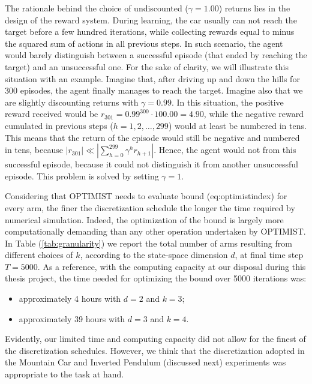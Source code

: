 \begin{remark} \label{rk:undiscounted}
The rationale behind the choice of undiscounted ($\gamma=1.00$) returns lies in the design of the reward system. During learning, the car usually can not reach the target before a few hundred iterations, while collecting rewards equal to minus the squared sum of actions in all previous steps. In such scenario, the agent would barely distinguish between a successful episode (that ended by reaching the target) and an unsuccessful one. For the sake of clarity, we will illustrate this situation with an example. Imagine that, after driving up and down the hills for 300 episodes, the agent finally manages to reach the target. Imagine also that we are slightly discounting returns with $\gamma=0.99$. In this situation, the positive reward received would be $r_{301}=0.99^{300}\cdot 100.00=4.90$, while the negative reward cumulated in previous steps ($h=1,2,\dots,299$) would at least be numbered in tens. This means that the return of the episode would still be negative and numbered in tens, because $|r_{301}|\ll |\sum_{h=0}^{299}\gamma^hr_{h+1}|$. Hence, the agent would not from this successful episode, because it could not distinguish it from another unsuccessful episode. This problem is solved by setting $\gamma=1$.
\end{remark}

\begin{remark} \label{rk:discretization}
Considering that \gls{OPTIMIST} needs to evaluate bound (eq:optimistindex) for every arm, the finer the discretization schedule the longer the time required by numerical simulation. Indeed, the optimization of the bound is largely more computationally demanding than any other operation undertaken by \gls{OPTIMIST}. In Table (\ref{tab:granularity}) we report the total number of arms resulting from different choices of $k$, according to the state-space dimension $d$, at final time step $T=5000$. As a reference, with the computing capacity at our disposal during this thesis project, the time needed for optimizing the bound over 5000 iterations was:

\begin{itemize}
\item approximately 4 hours with $d=2$ and $k=3$;
\item approximately 39 hours with $d=3$ and $k=4$.
\end{itemize} 

Evidently, our limited time and computing capacity did not allow for the finest of the discretization schedules. However, we think that the discretization adopted in the Mountain Car and Inverted Pendulum (discussed next) experiments was appropriate to the task at hand.
\end{remark}

